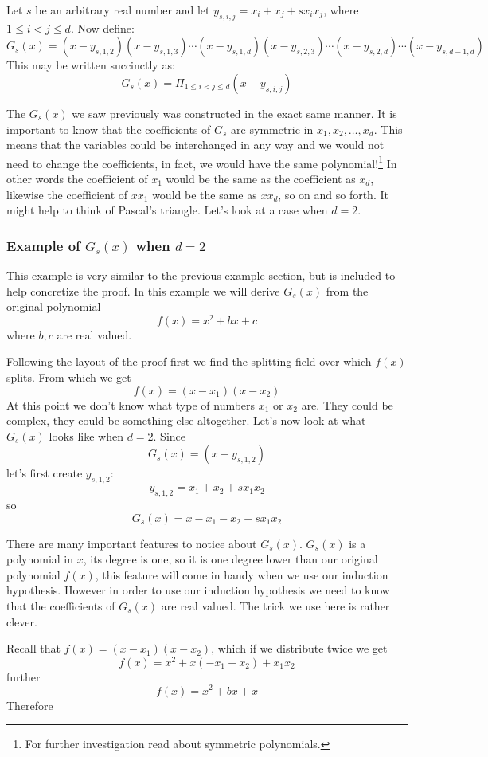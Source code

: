 \documentclass[12pt]{article}
\begin{document}
Let $s$ be an arbitrary real number and let $y_{s,i,j} = x_i +x_j + s x_i x_j$, where $1 \leq i < j \leq d$. Now define:
$$ G_s(x) =(x-y_{s,1,2})(x-y_{s,1,3})\cdots(x-y_{s,1,d})(x-y_{s,2,3})\cdots (x-y_{s,2,d})\cdots (x-y_{s,d-1,d})$$
This may be written succinctly as:
$$ G_s(x) = \Pi_{1 \leq i < j \leq d} (x-y_{s,i,j})$$

The $G_s(x)$ we saw previously was constructed in the exact same manner.
It is important to know that the coefficients of $G_s$ are symmetric in $x_1, x_2, \ldots, x_d$.  This means that the variables could be interchanged in any way and we would not need to change the coefficients, in fact, we would have the same polynomial!\footnote{For further investigation read about symmetric polynomials.}  In other words the coefficient of $x_1$ would be the same as the coefficient as $x_d$, likewise the coefficient of $x x_1$ would be the same as $x x_d$, so on and so forth.  It might help to think of Pascal's triangle.  Let's look at a case when $d=2$.

\subsubsection*{Example of $G_s(x)$ when $d=2$ }  This example is very similar to the previous example section, but is included to help concretize the proof.  In this example we will derive $G_s(x)$ from the original polynomial $$f(x)=x^2+bx+c$$ where $b, c$ are real valued.  

Following the layout of the proof first we find the splitting field over which $f(x)$ splits.  From which we get 
$$f(x)=(x-x_1)(x-x_2)$$  
At this point we don't know what type of numbers $x_1$ or $x_2$ are.  They could be complex, they could be something else altogether.  Let's now look at what $G_s(x)$ looks like when $d=2$.  Since $$G_s(x) = (x-y_{s,1,2})$$ let's first create $y_{s,1,2}$: 
$$y_{s,1,2} = x_1 +x_2 + s x_1 x_2$$
 so 
 $$G_s(x) = x- x_1 -x_2 - s x_1 x_2$$

There are many important features to notice about $G_s(x)$.  $G_s(x)$ is a polynomial in $x$, its degree is one, so it is one degree lower than our original polynomial $f(x)$, this feature will come in handy when we use our induction hypothesis.  However in order to use our induction hypothesis we need to know that the coefficients of $G_s(x)$ are real valued.  The trick we use here is rather clever.

Recall that $f(x) = (x-x_1)(x-x_2)$, which if we distribute twice we get $$f(x)= x^2 + x(-x_1-x_2)+ x_1x_2$$
further
$$f(x) = x^2 +bx + x$$
Therefore
\end{document}
